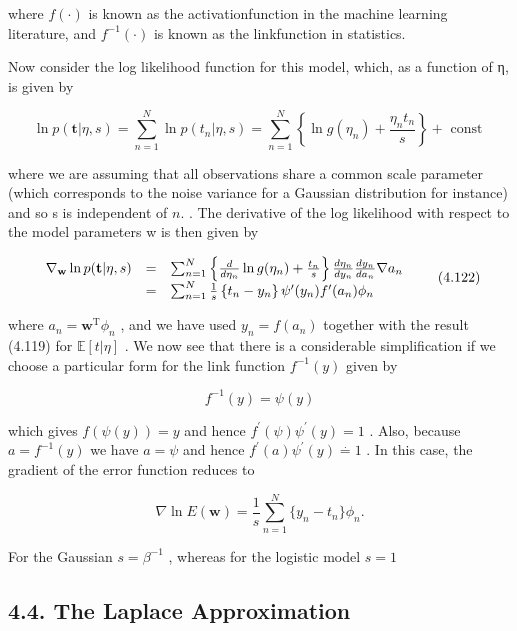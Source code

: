 \documentclass[
  10
]{article}
\begin{document}
where \(f ( \cdot )\) is known as the activationfunction in the machine
learning literature, and \(f ^ { - 1 } ( \cdot )\) is known as the
linkfunction in statistics.

Now consider the log likelihood function for this model, which, as a
function of η, is given by

\[
\ln p (\mathbf {t} | \eta , s) = \sum_ {n = 1} ^ {N} \ln p (t _ {n} | \eta , s) = \sum_ {n = 1} ^ {N} \left\{\ln g (\eta_ {n}) + \frac {\eta_ {n} t _ {n}}{s} \right\} + \text { const }\tag{4.121}
\]

where we are assuming that all observations share a common scale
parameter (which corresponds to the noise variance for a Gaussian
distribution for instance) and so s is independent of \(n .\) . The
derivative of the log likelihood with respect to the model parameters w
is then given by

\[
\begin{array}{r c l} \nabla_ {\mathbf {w}} \ln p (\mathbf {t} | \eta , s) & = & \sum_ {n = 1} ^ {N} \left\{\frac {d}{d \eta_ {n}} \ln g (\eta_ {n}) + \frac {t _ {n}}{s} \right\} \frac {d \eta_ {n}}{d y _ {n}} \frac {d y _ {n}}{d a _ {n}} \nabla a _ {n} \\ & = & \sum_ {n = 1} ^ {N} \frac {1}{s} \left\{t _ {n} - y _ {n} \right\} \psi^ {\prime} (y _ {n}) f ^ {\prime} (a _ {n}) \phi_ {n} \end{array}\tag{4.122}
\]

where \(a _ { n } = \mathbf { w } ^ { \mathrm { T } } \phi _ { n }\) ,
and we have used \(y _ { n } = f ( a _ { n } )\) together with the
result (4.119) for \(\mathbb { E } [ t | \eta ]\) . We now see that
there is a considerable simplification if we choose a particular form
for the link function \(f ^ { - 1 } ( y )\) given by

\[
f ^ {- 1} (y) = \psi (y)\tag{4.123}
\]

which gives \(f ( \psi ( y ) ) = y\) and hence
\(f ^ { \prime } ( \psi ) \psi ^ { \prime } ( y ) = 1\) . Also, because
\(a = f ^ { - 1 } ( y )\) we have \(a = \psi\) and hence
\(f ^ { \prime } ( a ) \psi ^ { \prime } ( y ) \stackrel { \cdot } { = } 1\)
. In this case, the gradient of the error function reduces to

\[
\nabla \ln E (\mathbf {w}) = \frac {1}{s} \sum_ {n = 1} ^ {N} \{y _ {n} - t _ {n} \} \phi_ {n}.\tag{4.124}
\]

For the Gaussian \(s = \beta ^ { - 1 }\) , whereas for the logistic
model \(s = 1\)

\subsection{4.4. The Laplace
Approximation}\label{the-laplace-approximation}
\end{document}
